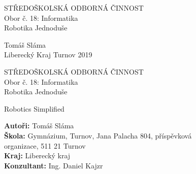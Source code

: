 \documentclass[a4paper, 12pt, twoside]{article}
\begin{document}
  \sloppy %



  \bfseries

  \begin{center}
    {\fontsize{18}{21.6} \selectfont STŘEDOŠKOLSKÁ ODBORNÁ ČINNOST}\\%
    \vspace*{\baselineskip}
    {\fontsize{14}{16.8} \selectfont Obor č. 18: Informatika}\\%

    \vspace{16em}
    {\fontsize{20}{24} \selectfont Robotika Jednoduše}%
    \vspace*{\fill}
  \end{center}

  \fontsize{16}{19.2} \selectfont
  Tomáš Sláma\\
  Liberecký Kraj
  \hfill
  Turnov 2019

  \cleardoublepage


  \newpage
  \begin{center}
    {\fontsize{18}{21.6} \selectfont STŘEDOŠKOLSKÁ ODBORNÁ ČINNOST}\\%
    \vspace*{\baselineskip}
    {\fontsize{14}{16.8} \selectfont Obor č. 18: Informatika}\\%

    \vspace{10em}
    \fontsize{20}{24} \selectfont
    Robotika Jednoduše%

    Robotics Simplified%
    \vspace*{\fill}
  \end{center}

  \normalfont
  \fontsize{16}{19.6} \selectfont

  \textbf{Autoři:} Tomáš Sláma\\
  \textbf{Škola:} Gymnázium, Turnov, Jana Palacha 804, příspěvková \\ organizace, 511 21 Turnov \\
  \textbf{Kraj:} Liberecký kraj \\
  \textbf{Konzultant:} Ing. Daniel Kajzr

  \vspace{\baselineskip}
\end{document}
